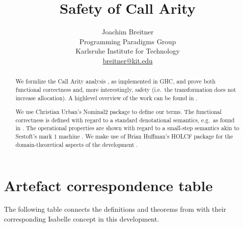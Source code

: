 \documentclass[11pt,a4paper,parskip=half]{scrartcl}
\begin{document}
\title{Safety of Call Arity}
\author{Joachim Breitner\\
Programming Paradigms Group\\
Karlsruhe Institute for Technology\\
\url{breitner@kit.edu}}
\maketitle


\begin{abstract}
We formlize the Call Arity analysis \cite{tfp}, as implemented in GHC, and prove both functional correctness and, more interestingly, safety (i.e.\ the transformation does not increase allocation). A highlevel overview of the work can be found in \cite{icfp15}.

We use Christian Urban's Nominal2 package \cite{nominal} to define our terms. The functional correctness is defined with regard to a standard denotational semantics, e.g.\ as found in \cite{launchbury}. The operational properties are shown with regard to a small-step semantics akin to Sestoft's mark 1 machine \cite{sestoft}.  We make use of Brian Huffman's HOLCF package for the domain-theoretical aspects of the development \cite{holcf}.

\end{abstract}

\section*{Artefact correspondence table}
\label{sec:table}

The following table connects the definitions and theorems from \cite{icfp15} with their corresponding Isabelle concept in this development. 

\newcommand{\seetheory}[1]{\hyperref[sec_#1]{#1}}
\end{document}
